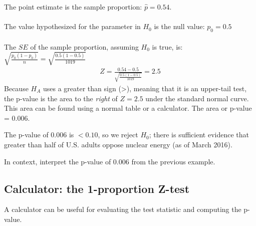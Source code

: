 \begin{examplewrap}
\begin{nexample}
\begin{description}
The point estimate is the sample proportion: $\hat{p} = 0.54.$\\
\\
The value hypothesized for the parameter in $H_0$ is the null value: $p_0 = 0.5$\\
\\
The $SE$ of the sample proportion, assuming $H_0$ is true, is: $\sqrt{\frac{p_0(1-p_0)}{n}}= \sqrt{\frac{0.5(1-0.5)}{1019}}$ \\
\begin{align*}
Z = \frac{0.54 - 0.5}{\sqrt{\frac{0.5(1-0.5)}{1019}}} = 2.5
\end{align*}
Because $H_A$ uses a greater than sign (>), meaning that it is an upper-tail test, the \mbox{p-value} is the area to the \emph{right} of $Z=2.5$ under the standard normal curve.  This area can be found using a normal table or a calculator.  The area or p-value = $0.006$.  
\item[\inferencestep{Conclude}]  The p-value of 0.006 is $< 0.10$, so we reject $H_0$; there is sufficient evidence that greater than half of U.S. adults oppose nuclear energy (as of March 2016).  
\end{description}
\end{nexample}
\end{examplewrap}



\begin{exercisewrap}
\begin{nexercise}
In context, interpret the p-value of 0.006 from the previous example.\footnotemark
\end{nexercise}
\end{exercisewrap}


\D{\newpage}

\subsection{Calculator:  the 1-proportion Z-test}
A calculator can be useful for evaluating the test statistic and computing the p-value.  
\label{1propZtest}

